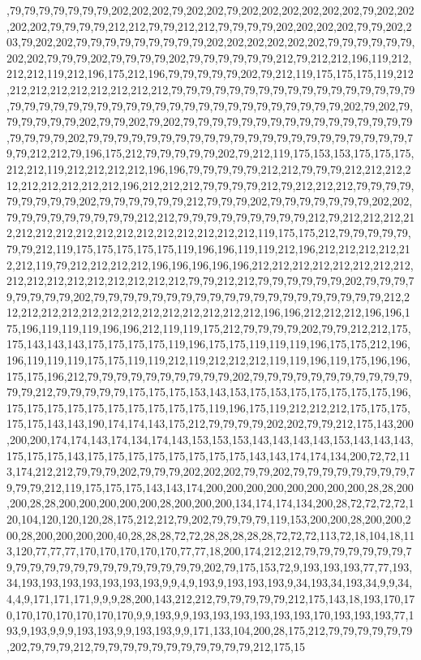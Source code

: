 ,79,79,79,79,79,79,79,202,202,202,79,202,202,79,202,202,202,202,202,202,79,202,202,202,202,79,79,79,79,212,212,79,79,212,212,79,79,79,79,202,202,202,202,79,79,202,203,79,202,202,79,79,79,79,79,79,79,79,79,202,202,202,202,202,202,79,79,79,79,79,79,202,202,79,79,79,202,79,79,79,79,202,79,79,79,79,79,79,212,79,212,212,196,119,212,212,212,119,212,196,175,212,196,79,79,79,79,79,202,79,212,119,175,175,175,119,212,212,212,212,212,212,212,212,212,79,79,79,79,79,79,79,79,79,79,79,79,79,79,79,79,79,79,79,79,79,79,79,79,79,79,79,79,79,79,79,79,79,79,79,79,79,79,79,79,202,79,202,79,79,79,79,79,79,202,79,79,202,79,202,79,79,79,79,79,79,79,79,79,79,79,79,79,79,79,79,79,79,79,79,202,79,79,79,79,79,79,79,79,79,79,79,79,79,79,79,79,79,79,79,79,79,79,79,79,212,212,79,196,175,212,79,79,79,79,79,202,79,212,119,175,153,153,175,175,175,212,212,119,212,212,212,212,196,196,79,79,79,79,79,212,212,79,79,79,212,212,212,212,212,212,212,212,212,196,212,212,212,79,79,79,79,212,79,212,212,212,79,79,79,79,79,79,79,79,79,202,79,79,79,79,79,79,212,79,79,79,202,79,79,79,79,79,79,79,202,202,79,79,79,79,79,79,79,79,79,212,212,79,79,79,79,79,79,79,79,79,212,79,212,212,212,212,212,212,212,212,212,212,212,212,212,212,212,212,119,175,175,212,79,79,79,79,79,79,79,212,119,175,175,175,175,175,119,196,196,119,119,212,196,212,212,212,212,212,212,119,79,212,212,212,212,196,196,196,196,196,212,212,212,212,212,212,212,212,212,212,212,212,212,212,212,212,212,79,79,212,212,79,79,79,79,79,79,202,79,79,79,79,79,79,79,79,202,79,79,79,79,79,79,79,79,79,79,79,79,79,79,79,79,79,79,79,79,212,212,212,212,212,212,212,212,212,212,212,212,212,212,196,196,212,212,212,196,196,175,196,119,119,119,196,196,212,119,119,175,212,79,79,79,79,202,79,79,212,212,175,175,143,143,143,175,175,175,175,119,196,175,175,119,119,119,196,175,175,212,196,196,119,119,119,175,175,119,119,212,119,212,212,212,119,119,196,119,175,196,196,175,175,196,212,79,79,79,79,79,79,79,79,79,79,202,79,79,79,79,79,79,79,79,79,79,79,79,79,212,79,79,79,79,79,175,175,175,153,143,153,175,153,175,175,175,175,175,196,175,175,175,175,175,175,175,175,175,175,119,196,175,119,212,212,212,175,175,175,175,175,143,143,190,174,174,143,175,212,79,79,79,79,202,202,79,79,212,175,143,200,200,200,174,174,143,174,134,174,143,153,153,153,143,143,143,143,153,143,143,143,175,175,175,143,175,175,175,175,175,175,175,175,143,143,174,174,134,200,72,72,113,174,212,212,79,79,79,202,79,79,79,202,202,202,79,79,202,79,79,79,79,79,79,79,79,79,79,79,212,119,175,175,175,143,143,174,200,200,200,200,200,200,200,200,28,28,200,200,28,28,200,200,200,200,200,28,200,200,200,134,174,174,134,200,28,72,72,72,72,120,104,120,120,120,28,175,212,212,79,202,79,79,79,79,119,153,200,200,28,200,200,200,28,200,200,200,200,40,28,28,28,72,72,28,28,28,28,28,72,72,72,113,72,18,104,18,113,120,77,77,77,170,170,170,170,170,77,77,18,200,174,212,212,79,79,79,79,79,79,79,79,79,79,79,79,79,79,79,79,79,79,79,79,79,202,79,175,153,72,9,193,193,193,77,77,193,34,193,193,193,193,193,193,193,9,9,4,9,193,9,193,193,193,9,34,193,34,193,34,9,9,34,4,4,9,171,171,171,9,9,9,28,200,143,212,212,79,79,79,79,79,212,175,143,18,193,170,170,170,170,170,170,170,170,9,9,193,9,9,193,193,193,193,193,193,170,193,193,193,77,193,9,193,9,9,9,193,193,9,9,193,193,9,9,171,133,104,200,28,175,212,79,79,79,79,79,79,202,79,79,79,212,79,79,79,79,79,79,79,79,79,79,79,212,175,15